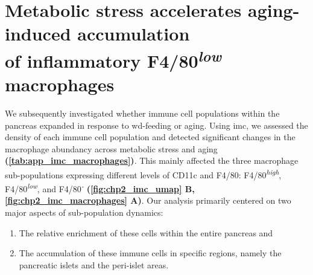 \section[Metabolic stress accelerates aging-induced accumulation of inflammatory F4/80\textsuperscript{\textit{low}} macrophages]{Metabolic stress accelerates aging-induced accumulation \\of inflammatory F4/80\textsuperscript{\textit{low}} macrophages}
\label{sec:imc_acceleration}

We subsequently investigated whether immune cell populations within the pancreas expanded in response to \gls{wd}-feeding or aging. Using \gls{imc}, we assessed the density of each immune cell population and detected significant changes in the macrophage abundancy across metabolic stress and aging \textbf{(\autoref{tab:app_imc_macrophages})}. This mainly affected the three macrophage sub-populations expressing different levels of CD11c and F4/80: F4/80\textsuperscript{\textit{high}}, F4/80\textsuperscript{\textit{low}}, and F4/80\textsuperscript{\textit{-}} \textbf{(\autoref{fig:chp2_imc_umap} B, \autoref{fig:chp2_imc_macrophages} A)}. Our analysis primarily centered on two major aspects of sub-population dynamics: 
\begin{enumerate}
    \item The relative enrichment of these cells within the entire pancreas and
    \item The accumulation of these immune cells in specific regions, namely the pancreatic islets and the peri-islet areas.
\end{enumerate}

